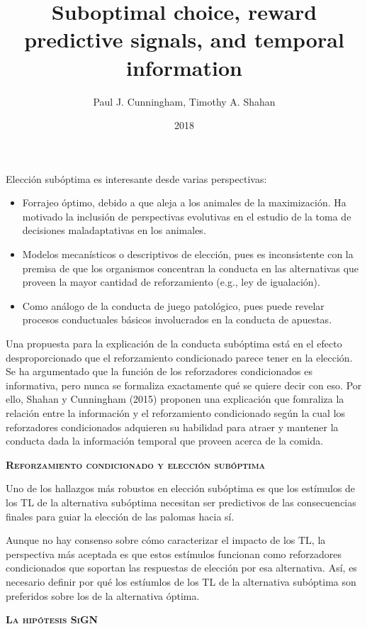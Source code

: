 \documentclass[a4paper,12pt]{article}
\title{Suboptimal choice, reward predictive signals, and temporal information}
\author{Paul J. Cunningham, Timothy A. Shahan}
\date{2018}
\begin{document}
{\scshape\bfseries \maketitle}

Elección subóptima es interesante desde varias perspectivas:
\begin{itemize}
	\item Forrajeo óptimo, debido a que aleja a los animales de la maximización. Ha motivado la inclusión de perspectivas evolutivas en el estudio de la toma de decisiones maladaptativas en los animales.
	\item Modelos mecanísticos o descriptivos de elección, pues es inconsistente con la premisa de que los organismos concentran la conducta en las alternativas que proveen la mayor cantidad de reforzamiento (e.g., ley de igualación).
	\item Como análogo de la conducta de juego patológico, pues puede revelar procesos conductuales básicos involucrados en la conducta de apuestas.
\end{itemize}

Una propuesta para la explicación de la conducta subóptima está en el efecto desproporcionado que el reforzamiento condicionado parece tener en la elección. Se ha argumentado que la función de los reforzadores condicionados es informativa, pero nunca se formaliza exactamente qué se quiere decir con eso. Por ello, Shahan y Cunningham (2015) proponen una explicación que fomraliza la relación entre la información y el reforzamiento condicionado según la cual los reforzadores condicionados adquieren su habilidad para atraer y mantener la conducta dada la información temporal que proveen acerca de la comida.

{\scshape\bfseries Reforzamiento condicionado y elección subóptima}

Uno de los hallazgos más robustos en elección subóptima es que los estímulos de los TL de la alternativa subóptima necesitan ser predictivos de las consecuencias finales para guiar la elección de las palomas hacia sí.

Aunque no hay consenso sobre cómo caracterizar el impacto de los TL, la perspectiva más aceptada es que estos estímulos funcionan como reforzadores condicionados que soportan las respuestas de elección por esa alternativa. Así, es necesario definir por qué los estíumlos de los TL de la alternativa subóptima son preferidos sobre los de la alternativa óptima.

{\scshape\bfseries La hipótesis SiGN}
\end{document}
